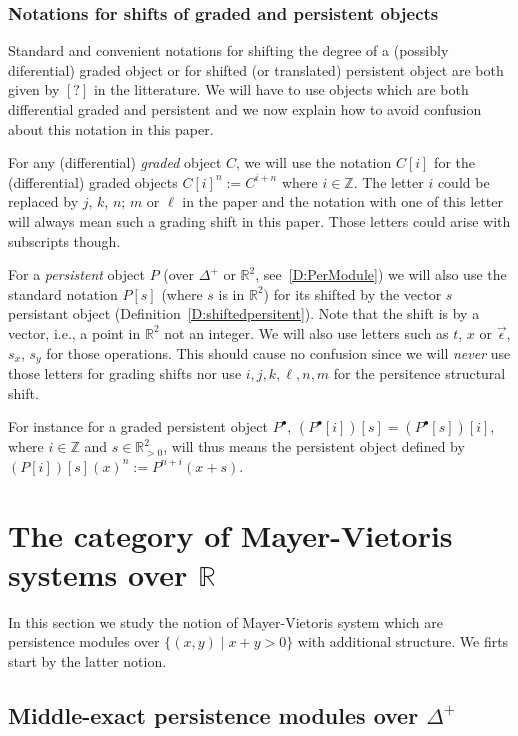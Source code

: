 \documentclass[a4paper, english, 11pt]{article}
\newcommand{\0}{\vec{0}}
\newcommand{\R}[0]{\mathbb{R}}
\newcommand{\Z}[0]{\mathbb{Z}}
\begin{document}
\subsubsection{Notations for shifts of graded and persistent objects}   
Standard and convenient notations for shifting the degree of a (possibly diferential) graded object or for  shifted (or translated) persistent object are both given by  $[?]$ in the litterature. We will have to use objects which are both differential graded and persistent and we now explain how to avoid confusion about this notation in this paper. 

For any (differential) \emph{graded} object $C$, we will use the notation $C[i]$ for the (differential) graded objects $C[i]^n:= C^{i+n}$ where $i\in \Z$. The letter $i$ could be replaced by $j$, $k$, $n$; $m$ or $\ell$ in the paper and the notation with one of this letter will always mean such a grading shift  in this paper. Those letters could arise with subscripts though. 

\smallskip

 For a \emph{persistent} object $P$ (over $\Delta^+$ or $\R^2$, see~\ref{D:PerModule}) we will also use the standard notation $P[s]$ (where $s$ is in $\R^2$) for its shifted by the vector $s$ persistant object (Definition~\ref{D:shiftedpersitent}). Note that the shift is by a vector, i.e., a point in $\R^2$ not an integer.  We will also use letters such as $t$, $x$ or $\vec{\epsilon}$, $s_x$, $s_y$ for those operations.  This should cause no confusion since we will \emph{never} use those letters for grading shifts nor use $i,j,k,\ell, n, m$ for the persitence structural shift. 
 
 \smallskip
 
 For instance for a graded persistent object $P^\bullet$, $(P^\bullet[i])[s]=(P^\bullet[s])[i]$, where $i\in \Z$ and $s\in \R^2_{>0}$, will thus means the  persistent object defined by $(P[i])[s] (x)^n:= P^{n+i}(x+s)$.

\section{The category of Mayer-Vietoris systems over $\R$}
In this section we study the notion of Mayer-Vietoris system which are persistence modules over $\{(x,y)\mid x+y > 0\}$ with additional structure. We firts start by the latter notion. 
\subsection{Middle-exact persistence modules over $\Delta^+$}
\end{document}
